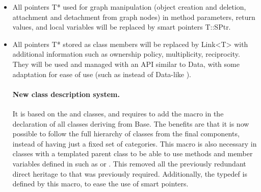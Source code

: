 \begin{itemize}
\item All pointers T* used for graph manipulation (object creation and deletion, attachment and detachment from graph nodes) in method parameters, return values, and local variables will be replaced by smart pointers T::SPtr.
\item All pointers T* stored as class members will be replaced by Link<T> with additional information such as ownership policy, multiplicity, reciprocity. They will be used and managed with an API similar to Data, with some adaptation for ease of use (such as  instead of Data-like ).
\begin{itemize}

\paragraph{New class description system.}
It is based on the  and  classes, and requires to add the  macro in the declaration of all classes deriving from Base.
The benefits are that it is now possible to follow the full hierarchy of classes from the final components, instead of having just a fixed set of categories.
This macro is also necessary in classes with a templated parent class to be able to use methods and member variables defined in  such as  or . This removed all the previously redundant direct heritage to  that was previously required.
Additionally, the  typedef is defined by this macro, to ease the use of smart pointers.


\end{itemize}
\end{itemize}
